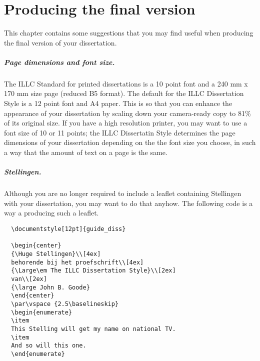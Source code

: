 \chapter{Producing the final version}
This chapter contains some suggestions that you may find useful 
when producing the final version of your dissertation.

\paragraph*{Page dimensions and font size.}
The ILLC Standard for printed dissertations is a
10 point font and a 240 mm x 170 mm size page (reduced B5 format).
The default for the ILLC Dissertation Style is a 12 point font and A4 paper.
This is so that you can enhance the appearance of your dissertation
by scaling down your camera-ready copy to 81\% of its original size.
If you have a high resolution printer, you may want to use a font size
of 10 or 11 points; 
the ILLC Dissertatin Style determines the page dimensions of your dissertation 
depending on the the font size you choose, in such a way that the amount of
text on a page is the same.

\paragraph*{Stellingen.}
Although you are no longer required to include a leaflet containing
Stellingen with your dissertation, you may want to do that anyhow.
The following code is a way a producing such a leaflet.
\begin{verbatim}
  \documentstyle[12pt]{guide_diss}
  
  \begin{center}
  {\Huge Stellingen}\\[4ex]
  behorende bij het proefschrift\\[4ex]
  {\Large\em The ILLC Dissertation Style}\\[2ex]
  van\\[2ex]
  {\large John B. Goode}
  \end{center}
  \par\vspace {2.5\baselineskip}
  \begin{enumerate}
  \item 
  This Stelling will get my name on national TV.
  \item
  And so will this one.
  \end{enumerate}
\end{verbatim}


